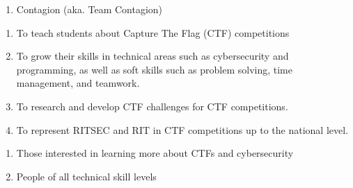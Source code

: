 

\begin{enumerate}
	\item Contagion (aka. Team Contagion)
\end{enumerate}


\begin{enumerate}
	\item To teach students about Capture The Flag (CTF) competitions
	\item To grow their skills in technical areas such as cybersecurity and programming,
	      as well as soft skills such as problem solving, time management, and teamwork.
	\item To research and develop CTF challenges for CTF competitions.
	\item To represent RITSEC and RIT in CTF competitions up to the national level.
\end{enumerate}


\begin{enumerate}
	\item Those interested in learning more about CTFs and cybersecurity
	\item People of all technical skill levels
\end{enumerate}